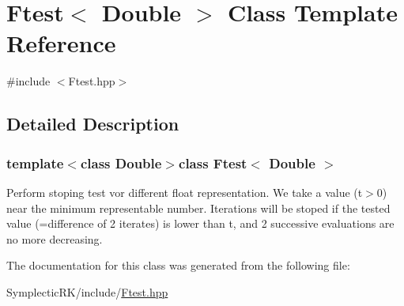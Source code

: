 \hypertarget{classFtest}{\section{Ftest$<$ Double $>$ Class Template Reference}
\label{classFtest}
}


{\ttfamily \#include $<$Ftest.\-hpp$>$}



\subsection{Detailed Description}
\subsubsection*{template$<$class Double$>$class Ftest$<$ Double $>$}

Perform stoping test vor different float representation. We take a value (t$>$0) near the minimum representable number. Iterations will be stoped if the tested value (=difference of 2 iterates) is lower than t, and 2 successive evaluations are no more decreasing. 

The documentation for this class was generated from the following file\-:\begin{DoxyCompactItemize}
\item 
Symplectic\-R\-K/include/\hyperlink{Ftest_8hpp}{Ftest.\-hpp}\end{DoxyCompactItemize}

